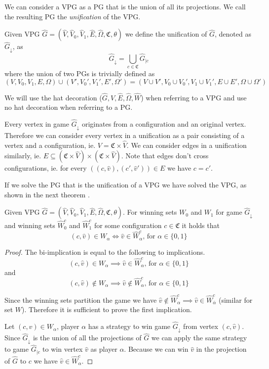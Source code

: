 We can consider a VPG as a PG that is the union of all its projections. We call the resulting PG the \textit{unification} of the VPG.
\begin{definition}
Given VPG $\hat{G} = (\hat{V},\hat{V}_0,\hat{V}_1, \hat{E},\hat{\Omega}, \mathfrak{C},\theta)$ we define the unification of $\hat{G}$, denoted as $\hat{G}_{\downarrow}$, as
\[  \hat{G}_{\downarrow} = \bigcup_{c\in \mathfrak{C}}\hat{G}_{|c} \]
where the union of two PGs is trivially defined as
\[ (V,V_0,V_1,E,\Omega) \cup (V',V_0',V_1',E',\Omega') = (V \cup V', V_0 \cup V_0', V_1 \cup V_1', E \cup E', \Omega \cup \Omega') \]
\end{definition}
We will use the hat decoration ($\hat{G},\hat{V},\hat{E},\hat{\Omega},\hat{W}$) when referring to a VPG and use no hat decoration when referring to a PG.

Every vertex in game $\hat{G}_{\downarrow}$ originates from a configuration and an original vertex. Therefore we can consider every vertex in a unification as a pair consisting of a vertex and a configuration, ie. $V = \mathfrak{C} \times \hat{V}$. We can consider edges in a unification similarly, ie. $E \subseteq (\mathfrak{C} \times \hat{V}) \times (\mathfrak{C} \times \hat{V})$. Note that edges don't cross configurations, ie. for every $((c,\hat{v}) , (c',\hat{v}')) \in E$ we have $c = c'$.

If we solve the PG that is the unification of a VPG we have solved the VPG, as shown in the next theorem .
\begin{theorem}
	\label{theA_solve_UVPG_is_solve_VPG}
	Given VPG $\hat{G} =  (\hat{V},\hat{V}_0,\hat{V}_1, \hat{E},\hat{\Omega}, \mathfrak{C},\theta)$. For winning sets $W_0$ and $W_1$ for game $\hat{G}_{\downarrow}$ and winning sets $\hat{W}^c_0$ and $\hat{W}^c_1$ for some configuration $c \in \mathfrak{C}$ it holds that
	\[(c,\hat{v}) \in W_\alpha \iff \hat{v} \in \hat{W}^c_\alpha  \text{, for }\alpha \in \{0,1\}  \]
	\begin{proof}
		The bi-implication is equal to  the following to implications.
		\[ (c,\hat{v}) \in W_\alpha \implies \hat{v} \in \hat{W}^c_\alpha  \text{, for }\alpha \in \{0,1\} \]
		and
		\[ (c,\hat{v}) \notin W_\alpha\implies \hat{v} \notin \hat{W}^c_\alpha \text{, for }\alpha \in \{0,1\}  \]
		
		Since the winning sets partition the game we have $\hat{v} \notin \hat{W}^c_\alpha \implies \hat{v} \in \hat{W}^c_{\overline{\alpha}}$ (similar for set $W$). Therefore it is sufficient to prove the first implication.
		
		Let $(c,\hat{v}) \in W_\alpha$, player $\alpha$ has a strategy to win game $\hat{G}_{\downarrow}$ from vertex $(c,\hat{v})$. Since $\hat{G}_{\downarrow}$ is the union of all the projections of $\hat{G}$ we can apply the same strategy to game $\hat{G}_{|c}$ to win vertex $\hat{v}$ as player $\alpha$. Because we can win $\hat{v}$ in the projection of $\hat{G}$ to $c$ we have $\hat{v} \in \hat{W}^c_\alpha$.
	\end{proof}
\end{theorem}

